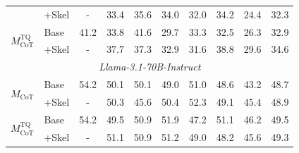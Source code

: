 \begin{table}[t]
\begin{tabular}{llcccccccc}
& +Skel & - & 33.4 & 35.6 & 34.0 & 32.0 & 34.2 & 24.4 & 32.3 \\
\multirow{2}{*}{$M_{\text{CoT}}^{\text{TQ}}$} & Base & 41.2 & 33.8 & 41.6 & 29.7 & 33.3 & 32.5 & 26.3 & 32.9 \\
& +Skel & - & 37.7 & 37.3 & 32.9 & 31.6 & 38.8 & 29.6 & 34.6 \\
\midrule
\multicolumn{10}{c}{\textit{Llama-3.1-70B-Instruct}} \\
\multirow{2}{*}{$M_{\text{CoT}}$} & Base & 54.2 & 50.1 & 50.1 & 49.0 & 51.0 & 48.6 & 43.2 & 48.7 \\
& +Skel & - & 50.3 & 45.6 & 50.4 & 52.3 & 49.1 & 45.4 & 48.9 \\
\multirow{2}{*}{$M_{\text{CoT}}^{\text{TQ}}$} & Base & 54.2 & 49.5 & 50.9 & 51.9 & 47.2 & 51.1 & 46.2 & 49.5 \\
& +Skel & - & 51.1 & 50.9 & 51.2 & 49.0 & 48.2 & 45.6 & 49.3 \\
\bottomrule
\end{tabular}

\end{table}
